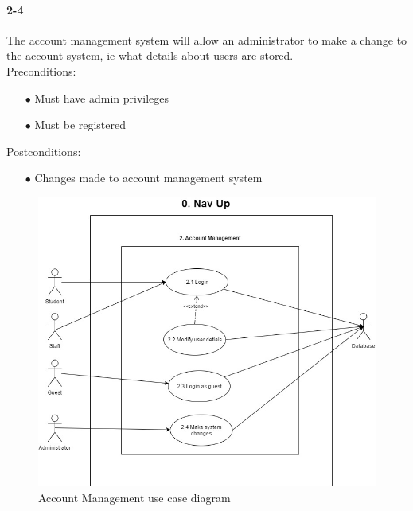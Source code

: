 \documentclass[a4paper,12pt]{article}
\begin{document}
\paragraph{2-4}
The account management system will allow an administrator to make a change to the account system, ie what details about users are stored.\\
Preconditions:
\begin{itemize}
	\item[$\bullet$] Must have admin privileges
	\item[$\bullet$] Must be registered
\end{itemize}
Postconditions:
\begin{itemize}
	\item[$\bullet$] Changes made to account management system
\end{itemize}
\begin{figure}[H]
\includegraphics[width=\textwidth]{UseCaseDiagrams/AccManagementUCD.JPG}
\caption{Account Management use case diagram}
\label{fig:Account Management Use Case Diagram}
\end{figure}
\end{document}
